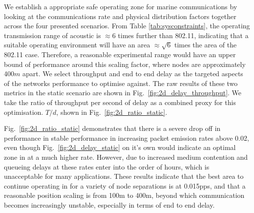 \documentclass[runningheads,a4paper]{llncs}
\begin{document}
We establish a appropriate safe operating zone for marine communications by looking at the communications rate and physical distribution factors together across the four presented scenarios.
From Table \ref{tab:sysconstraints}, the operating transmission range of acoustic is $\approx 6$ times further than 802.11, indicating that a suitable operating environment will have an area $\approx \sqrt{6}$ times the area of the 802.11 case.
Therefore, a reasonable experimental range would have an upper bound of performance around this scaling factor, where nodes are approximately 400$m$ apart. 
We select throughput and end to end delay as the targeted aspects of the networks performance to optimise against.
The raw results of these two metrics in the static scenario are shown in Fig.~\ref{fig:2d_delay_throughput}.
We take the ratio of throughput per second of delay as a combined proxy for this optimisation. $T/d$, shown in Fig.~\ref{fig:2d_ratio_static}.

Fig.~\ref{fig:2d_ratio_static} demonstrates that there is a severe drop off in performance in stable performance in increasing packet emission rates above 0.02, even though Fig.~\ref{fig:2d_delay_static} on it's own would indicate an optimal zone in at a much higher rate.
However, due to increased medium contention and queueing delays at these rates enter into the order of hours, which is unacceptable for many applications.
These results indicate that the best area to continue operating in for a variety of node separations is at 0.015pps, and that a reasonable position scaling is from 100m to 400m, beyond which communication becomes increasingly unstable, especially in terms of end to end delay.
\end{document}
